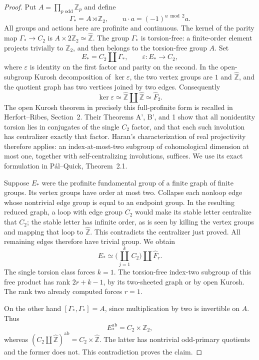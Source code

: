 \begin{proof}
Put \(A=\prod_{p\text{ odd}}\mathbb Z_p\) and define
\[
 \Gamma_*=A\rtimes\mathbb Z_2,
 \qquad u\cdot a=(-1)^{u\bmod2}a.
\]
All groups and actions here are profinite and continuous.
The kernel of the parity map \(\Gamma_*\to C_2\) is
\(A\times2\mathbb Z_2\simeq\widehat{\mathbb Z}\).
The group \(\Gamma_*\) is torsion-free: a finite-order
element projects trivially to \(\mathbb Z_2\), and then
belongs to the torsion-free group \(A\).
Set
\[
 E_*=C_2\amalg\Gamma_*,\qquad
 \varepsilon:E_*\longrightarrow C_2,
\]
where \(\varepsilon\) is identity on the first factor
and parity on the second. In the open-subgroup Kurosh
decomposition of \(\ker\varepsilon\), the two vertex
groups are \(1\) and \(\widehat{\mathbb Z}\), and the
quotient graph has two vertices joined by two edges.
Consequently
\[
 \ker\varepsilon\simeq
 \widehat{\mathbb Z}\amalg\widehat{\mathbb Z}
 \simeq\widehat F_2.
\]
The open Kurosh theorem in precisely this full-profinite
form is recalled in Herfort--Ribes, Section~2.
Their Theorems A', B', and 1 show that all nonidentity
torsion lies in conjugates of the single \(C_2\)
factor, and that each such involution has centralizer
exactly that factor.\cite{A_HR1985}
Haran's characterization of real projectivity therefore
applies: an index-at-most-two subgroup of cohomological
dimension at most one, together with self-centralizing
involutions, suffices. We use its exact formulation in
P\'al--Quick, Theorem~2.1.\cite{A_PalQuickFormal2025}

Suppose \(E_*\) were the profinite fundamental group of
a finite graph of finite groups. Its vertex groups have
order at most two. Collapse each nonloop edge whose
nontrivial edge group is equal to an endpoint group.
In the resulting reduced graph, a loop with edge group
\(C_2\) would make its stable letter centralize that
\(C_2\); the stable letter has infinite order, as is
seen by killing the vertex groups and mapping that
loop to \(\widehat{\mathbb Z}\). This contradicts the
centralizer just proved. All remaining edges therefore
have trivial group. We obtain
\[
 E_*\simeq\bigl(\mathop{\amalg}_{j=1}^{k}C_2\bigr)
                   \amalg\widehat F_r .
\]
The single torsion class forces \(k=1\). The
torsion-free index-two subgroup of this free product
has rank \(2r+k-1\), by its two-sheeted graph or by
open Kurosh. The rank two already computed forces
\(r=1\).

On the other hand \([\Gamma_*,\Gamma_*]=A\), since
multiplication by two is invertible on \(A\).
Thus
\[
 E_*^{\mathrm{ab}}=C_2\times\mathbb Z_2,
\]
whereas \((C_2\amalg\widehat{\mathbb Z})^{\mathrm{ab}}
=C_2\times\widehat{\mathbb Z}\). The latter has
nontrivial odd-primary quotients and the former does not.
This contradiction proves the claim.
\end{proof}

